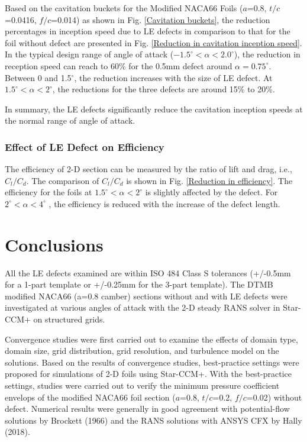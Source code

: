\documentclass[onecolumn,11pt]{report}
\begin{document}
Based on the cavitation buckets for the Modified NACA66 Foils ($a$=0.8, $t/c$=0.0416, $f/c$=0.014) as shown in Fig. \ref{Cavitation buckets}, the reduction percentages in inception speed due to LE defects in comparison to that for the foil without defect are presented in Fig. \ref{Reduction in cavitation inception speed}. In the typical design range of angle of attack ($-1.5^\circ < \alpha < 2.0^\circ$), the reduction in reception speed can reach to 60\% for the 0.5mm defect around $\alpha=0.75^\circ$. Between 0 and 1.5$^\circ$, the reduction increases with the size of LE defect. At $1.5^\circ < \alpha < 2^\circ$, the reductions for the three defects are around 15\% to 20\%. 

In summary, the LE defects significantly reduce the cavitation inception speeds at the normal range of angle of attack.


\subsection{Effect of LE Defect on Efficiency}

The efficiency of 2-D section can be measured by the ratio of lift and drag, i.e., $C_l/C_d$. The comparison of $C_l/C_d$ is shown in Fig. \ref{Reduction in efficiency}. The efficiency for the foils at $1.5^\circ<\alpha<2^\circ$ is slightly affected by the defect. For $2^\circ<\alpha<4^\circ$ , the efficiency is reduced with the increase of the defect length.



\chapter{Conclusions}
 
All the LE defects examined are within ISO 484 Class S tolerances (+/-0.5mm for a 1-part template or +/-0.25mm for the 3-part template). The DTMB modified NACA66 (a=0.8 camber) sections without and with LE defects were investigated at various angles of attack with the 2-D steady RANS solver in Star-CCM+ on structured grids.

Convergence studies were first carried out to examine the effects of domain type, domain size, grid distribution, grid resolution, and turbulence model on the solutions. Based on the results of convergence studies, best-practice settings were proposed for simulations of 2-D foils using Star-CCM+. With the best-practice settings, studies were carried out to verify the minimum pressure coefficient envelops of the modified NACA66 foil section ($a$=0.8, $t/c$=0.2, $f/c$=0.02) without defect. Numerical results were generally in good agreement with potential-flow solutions by Brockett (1966) and the RANS solutions with ANSYS CFX by Hally (2018). 
\end{document}

